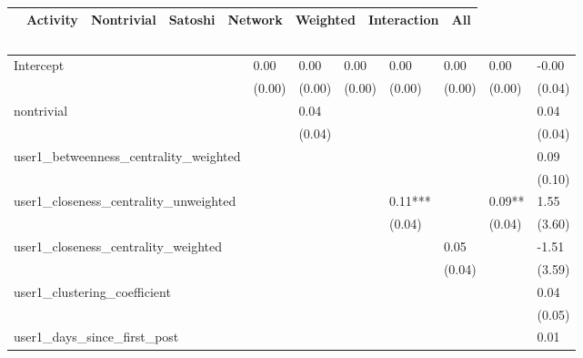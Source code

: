 \begin{table}
\caption{}
\begin{center}
\begin{tabular}{lccccccc}
\hline
                                      & Activity & Nontrivial & Satoshi & Network & Weighted & Interaction &     All       \\
\hline
\hline
\end{tabular}
\begin{tabular}{llllllll}
Intercept                             & 0.00     & 0.00       & 0.00    & 0.00    & 0.00     & 0.00        & -0.00         \\
                                      & (0.00)   & (0.00)     & (0.00)  & (0.00)  & (0.00)   & (0.00)      & (0.04)        \\
nontrivial                            &          & 0.04       &         &         &          &             & 0.04          \\
                                      &          & (0.04)     &         &         &          &             & (0.04)        \\
user1_betweenness_centrality_weighted &          &            &         &         &          &             & 0.09          \\
                                      &          &            &         &         &          &             & (0.10)        \\
user1_closeness_centrality_unweighted &          &            &         & 0.11*** &          & 0.09**      & 1.55          \\
                                      &          &            &         & (0.04)  &          & (0.04)      & (3.60)        \\
user1_closeness_centrality_weighted   &          &            &         &         & 0.05     &             & -1.51         \\
                                      &          &            &         &         & (0.04)   &             & (3.59)        \\
user1_clustering_coefficient          &          &            &         &         &          &             & 0.04          \\
                                      &          &            &         &         &          &             & (0.05)        \\
user1_days_since_first_post           &          &            &         &         &          &             & 0.01          \\

\end{tabular}
\end{center}
\end{table}
